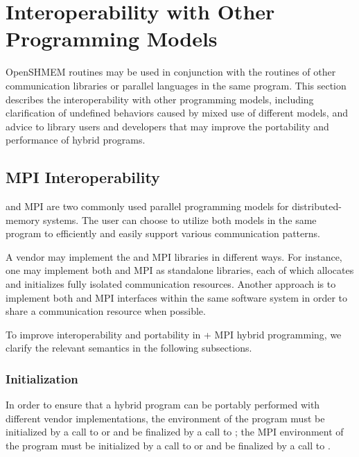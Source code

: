 \chapter{Interoperability with Other Programming Models}\label{sec:interoperability}

OpenSHMEM routines may be used in conjunction with the routines of other
communication libraries or parallel languages in the same program. This section
describes the interoperability with other programming models, including
clarification of undefined behaviors caused by mixed use of different models,
and advice to \openshmem library users and developers that may improve the portability
and performance of hybrid programs.


\section{MPI Interoperability}

\openshmem and MPI are two commonly used parallel programming models for
distributed-memory systems. The user can choose to utilize both models in the same program
to efficiently and easily support various communication patterns.

A vendor may implement the \openshmem and MPI libraries in different ways. For
instance, one may implement both \openshmem and MPI as standalone libraries,
each of which allocates and initializes fully isolated communication
resources.
Another approach
is to implement both \openshmem and MPI interfaces within the
same software system in order to share a communication resource when possible.

To improve interoperability and portability in \openshmem + MPI hybrid
programming, we clarify the relevant semantics in the following subsections.


\subsection{Initialization}
In order to ensure that a hybrid program can be portably performed with different vendor
implementations, the \openshmem environment of the program must be initialized by
a call to  or  and be finalized by
a call to ; the MPI environment of the program must be initialized
by a call to  or  and be finalized by a
call to .



